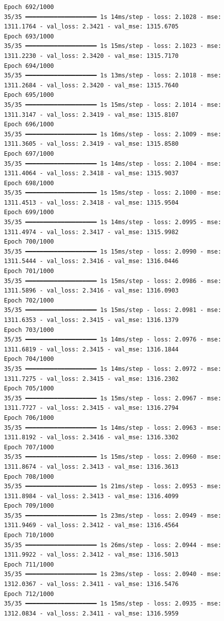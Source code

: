\documentclass[
  letterpaper,
  DIV=11,
  numbers=noendperiod]{scrreprt}
\begin{document}
\begin{verbatim}
Epoch 692/1000
35/35 ━━━━━━━━━━━━━━━━━━━━ 1s 14ms/step - loss: 2.1028 - mse: 1311.1764 - val_loss: 2.3421 - val_mse: 1315.6705
Epoch 693/1000
35/35 ━━━━━━━━━━━━━━━━━━━━ 1s 15ms/step - loss: 2.1023 - mse: 1311.2230 - val_loss: 2.3420 - val_mse: 1315.7170
Epoch 694/1000
35/35 ━━━━━━━━━━━━━━━━━━━━ 1s 13ms/step - loss: 2.1018 - mse: 1311.2684 - val_loss: 2.3420 - val_mse: 1315.7640
Epoch 695/1000
35/35 ━━━━━━━━━━━━━━━━━━━━ 1s 15ms/step - loss: 2.1014 - mse: 1311.3147 - val_loss: 2.3419 - val_mse: 1315.8107
Epoch 696/1000
35/35 ━━━━━━━━━━━━━━━━━━━━ 1s 16ms/step - loss: 2.1009 - mse: 1311.3605 - val_loss: 2.3419 - val_mse: 1315.8580
Epoch 697/1000
35/35 ━━━━━━━━━━━━━━━━━━━━ 1s 14ms/step - loss: 2.1004 - mse: 1311.4064 - val_loss: 2.3418 - val_mse: 1315.9037
Epoch 698/1000
35/35 ━━━━━━━━━━━━━━━━━━━━ 1s 15ms/step - loss: 2.1000 - mse: 1311.4513 - val_loss: 2.3418 - val_mse: 1315.9504
Epoch 699/1000
35/35 ━━━━━━━━━━━━━━━━━━━━ 1s 14ms/step - loss: 2.0995 - mse: 1311.4974 - val_loss: 2.3417 - val_mse: 1315.9982
Epoch 700/1000
35/35 ━━━━━━━━━━━━━━━━━━━━ 1s 15ms/step - loss: 2.0990 - mse: 1311.5444 - val_loss: 2.3416 - val_mse: 1316.0446
Epoch 701/1000
35/35 ━━━━━━━━━━━━━━━━━━━━ 1s 15ms/step - loss: 2.0986 - mse: 1311.5896 - val_loss: 2.3416 - val_mse: 1316.0903
Epoch 702/1000
35/35 ━━━━━━━━━━━━━━━━━━━━ 1s 15ms/step - loss: 2.0981 - mse: 1311.6353 - val_loss: 2.3415 - val_mse: 1316.1379
Epoch 703/1000
35/35 ━━━━━━━━━━━━━━━━━━━━ 1s 14ms/step - loss: 2.0976 - mse: 1311.6819 - val_loss: 2.3415 - val_mse: 1316.1844
Epoch 704/1000
35/35 ━━━━━━━━━━━━━━━━━━━━ 1s 14ms/step - loss: 2.0972 - mse: 1311.7275 - val_loss: 2.3415 - val_mse: 1316.2302
Epoch 705/1000
35/35 ━━━━━━━━━━━━━━━━━━━━ 1s 15ms/step - loss: 2.0967 - mse: 1311.7727 - val_loss: 2.3415 - val_mse: 1316.2794
Epoch 706/1000
35/35 ━━━━━━━━━━━━━━━━━━━━ 1s 14ms/step - loss: 2.0963 - mse: 1311.8192 - val_loss: 2.3416 - val_mse: 1316.3302
Epoch 707/1000
35/35 ━━━━━━━━━━━━━━━━━━━━ 1s 15ms/step - loss: 2.0960 - mse: 1311.8674 - val_loss: 2.3413 - val_mse: 1316.3613
Epoch 708/1000
35/35 ━━━━━━━━━━━━━━━━━━━━ 1s 21ms/step - loss: 2.0953 - mse: 1311.8984 - val_loss: 2.3413 - val_mse: 1316.4099
Epoch 709/1000
35/35 ━━━━━━━━━━━━━━━━━━━━ 1s 23ms/step - loss: 2.0949 - mse: 1311.9469 - val_loss: 2.3412 - val_mse: 1316.4564
Epoch 710/1000
35/35 ━━━━━━━━━━━━━━━━━━━━ 1s 26ms/step - loss: 2.0944 - mse: 1311.9922 - val_loss: 2.3412 - val_mse: 1316.5013
Epoch 711/1000
35/35 ━━━━━━━━━━━━━━━━━━━━ 1s 23ms/step - loss: 2.0940 - mse: 1312.0367 - val_loss: 2.3411 - val_mse: 1316.5476
Epoch 712/1000
35/35 ━━━━━━━━━━━━━━━━━━━━ 1s 15ms/step - loss: 2.0935 - mse: 1312.0834 - val_loss: 2.3411 - val_mse: 1316.5959

\end{verbatim}
\end{document}
